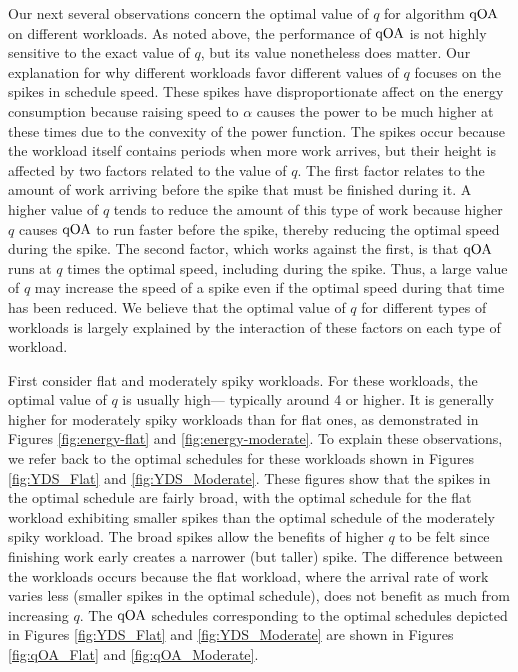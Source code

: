 \documentclass[11pt]{article}
\newcommand{\qOA}{{\rm qOA}}
\begin{document}
Our next several observations concern the optimal value of $q$ for
algorithm $\qOA$ on different workloads.
As noted above, the performance of $\qOA$ is not highly
sensitive to the exact value of $q$, but its value nonetheless
does matter.
Our explanation for why different workloads favor different values of
$q$ focuses on the spikes in schedule speed.
These spikes have disproportionate affect on the energy consumption because
raising speed to $\alpha$ causes the power to be much higher at
these times due to the convexity of the power function.
The spikes occur because the workload itself contains periods when more work
arrives, but their height is affected by two factors related to the
value of $q$.
The first factor relates to the amount of work arriving before the spike
that must be finished during it.
A higher value of $q$ tends to reduce the amount of this type of work
because higher $q$ causes $\qOA$ to
run faster before the spike, thereby reducing the optimal speed during
the spike.
The second factor, which works against the first, is that $\qOA$ runs
at $q$ times the optimal speed, including during the spike.
Thus, a large value of $q$ may increase the speed of a spike even if
the optimal speed during that time has been reduced.
We believe that the optimal value of $q$ for different types of
workloads is largely explained by the interaction of these factors on
each type of workload. 

First consider flat and moderately spiky workloads.
For these workloads, the optimal value of $q$ is usually high---
typically around 4 or higher.
It is generally higher for moderately spiky workloads than for flat
ones, as demonstrated in Figures \ref{fig:energy-flat} and
\ref{fig:energy-moderate}.
To explain these observations, we refer back to the optimal schedules
for these workloads shown in Figures \ref{fig:YDS_Flat} and
\ref{fig:YDS_Moderate}.
These figures show that the spikes in the optimal schedule are fairly
broad, with the optimal schedule for the flat workload exhibiting
smaller spikes than the optimal schedule of the moderately spiky
workload.
The broad spikes allow the benefits of higher $q$ to be felt since
finishing work early creates a narrower (but taller) spike.
The difference between the workloads occurs because 
the flat workload, where the arrival rate of work varies less (smaller
spikes in the optimal schedule), does not benefit as much from
increasing $q$.
The $\qOA$ schedules corresponding to the optimal schedules depicted in
Figures \ref{fig:YDS_Flat} and
\ref{fig:YDS_Moderate} are shown in 
Figures \ref{fig:qOA_Flat} and \ref{fig:qOA_Moderate}.
\end{document}
